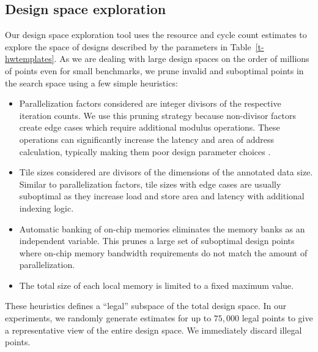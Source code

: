 

\subsection{Design space exploration}
Our design space exploration tool uses the resource and cycle count estimates
to explore the space of designs described by the parameters in Table~\ref{t-hwtemplates}.
As we are dealing with large design spaces on the order of millions of points even for small benchmarks,
we prune invalid and suboptimal points in the search space using a few simple heuristics:
\begin{itemize}
  \item Parallelization factors considered are integer divisors of the respective iteration counts. We use this pruning strategy because non-divisor factors create edge cases which require additional modulus operations. These operations can significantly increase the latency and area of address calculation, typically making them poor design parameter choices \cite{raghus-paper}.
  \item Tile sizes considered are divisors of the dimensions of the annotated data size. Similar to parallelization factors, tile sizes with edge cases are usually suboptimal as they increase load and store area and latency with additional indexing logic.
  \item Automatic banking of on-chip memories eliminates the memory banks as an independent variable. This prunes a large set of suboptimal design points where on-chip memory bandwidth requirements do not match the amount of parallelization.
  \item The total size of each local memory is limited to a fixed maximum value.
\end{itemize}

These heuristics defines a ``legal'' subspace of the total design space.
In our experiments, we randomly generate estimates for up to $75,000$ legal
points to give a representative view of the entire design space. We immediately
discard illegal points.

